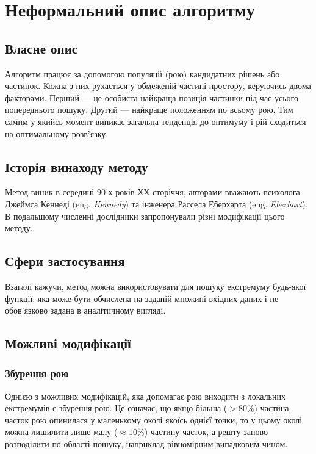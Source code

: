 \documentclass[a4paper, 12pt]{article}
\author{Скибицький Нікіта}
\date{\today}
\numberwithin{equation}{section}
\begin{document}

\tableofcontents

\section{Неформальний опис алгоритму}

\subsection{Власне опис}

Алгоритм працює за допомогою популяції (рою) кандидатних рішень або частинок. Кожна з них рухається у обмеженій частині простору, керуючись двома факторами. Перший --- це особиста найкраща позиція частинки під час усього попереднього пошуку. Другий --- найкраще положенням по всьому рою. Тим самим у якийсь момент виникає загальна тенденція до оптимуму і рій сходиться на оптимальному розв'язку.

\subsection{Історія винаходу методу}

Метод виник в середині 90-х років ХХ сторіччя, авторами вважають психолога Джеймса Кеннеді (eng. \textit{Kennedy}) та інженера Рассела Еберхарта (eng. \textit{Eberhart}). В подальшому численні дослідники запропонували різні модифікації цього методу.

\subsection{Сфери застосування}

Взагалі кажучи, метод можна використовувати для пошуку екстремуму будь-якої функції, яка може бути обчислена на заданій множині вхідних даних і не обов'язково задана в аналітичному вигляді.

\subsection{Можливі модифікації}

\subsubsection{Збурення рою}

Однією з можливих модифікацій, яка допомагає рою виходити з локальних екстремумів є збурення рою. Це означає, що якщо більша ($> 80\%$) частина часток рою опинилася у маленькому околі якоїсь однієї точки, то у цьому околі можна лишилити лише малу ($\approx 10\%$) частину часток, а решту заново розподілити по області пошуку, наприклад рівномірним випадковим чином. \medskip
\end{document}
